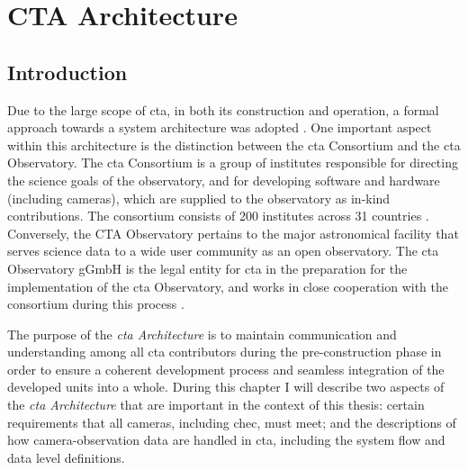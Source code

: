 \chapter{\label{ch3-architecture}CTA Architecture} 

\minitoc


\section{Introduction}

Due to the large scope of \gls{cta}, in both its construction and operation, a formal approach towards a system architecture was adopted \cite{Dazzi2018}. One important aspect within this architecture is the distinction between the \gls{cta} Consortium and the \gls{cta} Observatory. The \gls{cta} Consortium is a group of institutes responsible for directing the science goals of the observatory, and for developing software and hardware (including cameras), which are supplied to the observatory as in-kind contributions. The consortium consists of 200 institutes across 31 countries \cite{cta-consortium}. Conversely, the CTA Observatory pertains to the major astronomical facility that serves science data to a wide user community as an open observatory. The \gls{cta} Observatory gGmbH is the legal entity for \gls{cta} in the preparation for the implementation of the \gls{cta} Observatory, and works in close cooperation with the consortium during this process \cite{cta-observatory}.

The purpose of the \textit{\gls{cta} Architecture} is to maintain communication and understanding among all \gls{cta} contributors during the pre-construction phase in order to ensure a coherent development process and seamless integration of the developed units into a whole. During this chapter I will describe two aspects of the \textit{\gls{cta} Architecture} that are important in the context of this thesis: certain requirements that all cameras, including \gls{chec}, must meet; and the descriptions of how camera-observation data are handled in \gls{cta}, including the system flow and data level definitions.

